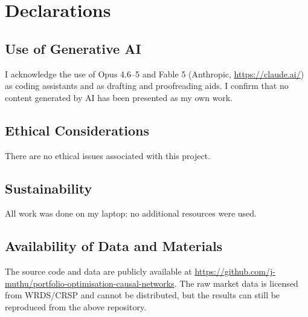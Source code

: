 \documentclass[12pt, a4paper]{report}
\newcommand{\skelsamp}{\textsc{skeleton-hrp}}
\newcommand{\skelsem}{\textsc{skeleton-sem-hrp}}
\newcommand{\orientsamp}{\textsc{ordered-hrp}}
\newcommand{\orientsem}{\textsc{ordered-sem-hrp}}
\begin{document}
\tableofcontents
\listoffigures
\listoftables
\clearpage









\clearpage
\printbibliography[heading=bibintoc, title={References}]

\chapter*{Declarations}

\section*{Use of Generative AI}
I acknowledge the use of Opus 4.6--5 and Fable 5 
(Anthropic, \url{https://claude.ai/}) as coding assistants
and as drafting and proofreading aids. 
I confirm that no content generated by AI has been presented as my own work.

\section*{Ethical Considerations}
There are no ethical issues associated with this project.

\section*{Sustainability}
All work was done on my laptop: no additional resources were used.

\section*{Availability of Data and Materials}
The source code and data are publicly available at
\url{https://github.com/j-muthu/portfolio-optimisation-causal-networks}.
The raw market data is licensed from WRDS/CRSP and cannot be distributed,
but the results can still be reproduced from the above repository.

\appendix

\end{document}
